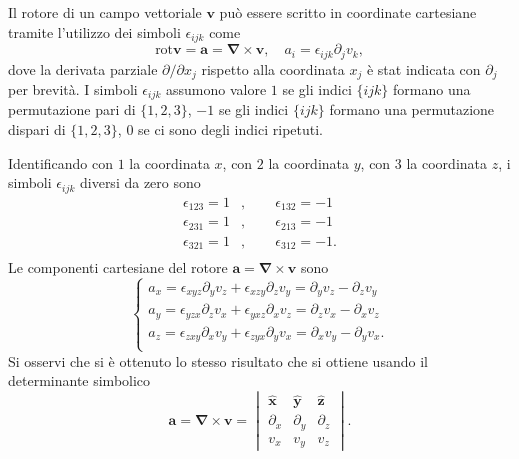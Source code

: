  \begin{operator}[Rotore]
  Il rotore di un campo vettoriale $\bm{v}$ può essere scritto in coordinate cartesiane tramite l'utilizzo dei simboli $\epsilon_{ijk}$ come
  \begin{equation}
   \text{rot}\bm{v} = \bm{a} = \bm{\nabla} \times \bm{v} , \quad a_i = \epsilon_{ijk} \partial_j v_k ,
  \end{equation}
  dove la derivata parziale $\partial/\partial x_j$ rispetto alla coordinata $x_j$ è stat indicata con $\partial_j$ per brevità.
  I simboli $\epsilon_{ijk}$ assumono valore $1$ se gli indici $\{ijk\}$ formano una permutazione pari di $\{1,2,3\}$,
  $-1$ se gli indici $\{ijk\}$ formano una permutazione dispari di $\{1,2,3\}$, $0$ se ci sono degli indici ripetuti.
  \end{operator}
  Identificando con $1$ la coordinata $x$, con $2$ la coordinata $y$, con $3$ la coordinata $z$, i simboli $\epsilon_{ijk}$ diversi da zero sono
  \begin{equation}
  \begin{aligned}
    \epsilon_{123} = 1 & , \qquad \epsilon_{132} = -1 \\
    \epsilon_{231} = 1 & , \qquad \epsilon_{213} = -1 \\
    \epsilon_{321} = 1 & , \qquad \epsilon_{312} = -1 . \\ 
  \end{aligned}
  \end{equation}
  Le componenti cartesiane del rotore $\bm{a} = \bm{\nabla} \times \bm{v}$ sono
  \begin{equation}
  \begin{cases}
   a_x = \epsilon_{xyz} \partial_y v_z + \epsilon_{xzy} \partial_z v_y = \partial_y v_z - \partial_z v_y  \\
   a_y = \epsilon_{yzx} \partial_z v_x + \epsilon_{yxz} \partial_x v_z = \partial_z v_x - \partial_x v_z  \\
   a_z = \epsilon_{zxy} \partial_x v_y + \epsilon_{zyx} \partial_y v_x = \partial_x v_y - \partial_y v_x .\\
  \end{cases}
  \end{equation}
  Si osservi che si è ottenuto lo stesso risultato che si ottiene usando il determinante simbolico
  \begin{equation}
    \bm{a} = \bm{\nabla} \times \bm{v} = 
    \begin{vmatrix}
     \bm{\hat{x}} & \bm{\hat{y}} & \bm{\hat{z}} \\
     \partial_x   & \partial_y   & \partial_z   \\
     v_x          & v_y          & v_z
    \end{vmatrix} .
  \end{equation}
